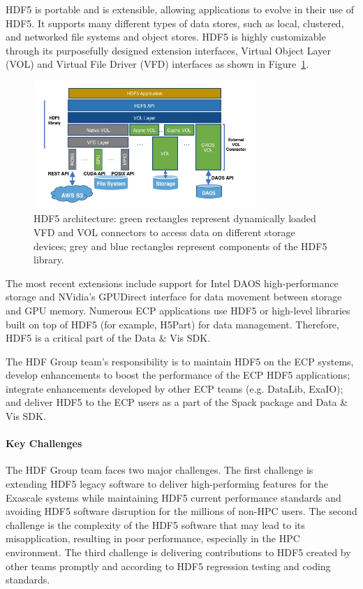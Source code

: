 HDF5 is portable and is extensible, allowing applications to evolve in their use of HDF5. It supports many different types of data stores, such as local, clustered, and networked file systems and object stores. HDF5 is highly customizable through its purposefully designed extension interfaces, Virtual Object Layer (VOL) and Virtual File Driver (VFD) interfaces as shown in Figure~\ref{fig:HDF5-Arch}.
\begin{figure}[htb]
    \centering
    \includegraphics[width=0.75\textwidth]{projects/2.3.4-DataViz/2.3.4.01-DataViz-SDK/HDF5-Arch-small.png}
    \caption{\label{fig:HDF5-Arch}
    HDF5 architecture: green rectangles represent dynamically loaded VFD and VOL connectors to access data on different storage devices; grey and blue rectangles represent components of the HDF5 library.}
\end{figure}

 The most recent extensions include support for Intel DAOS high-performance storage and NVidia’s GPUDirect interface for data movement between storage and GPU memory. 
Numerous ECP applications use HDF5 or high-level libraries built on top of HDF5 (for example, H5Part) for data management. Therefore, HDF5 is a critical part of the Data \& Vis SDK. 

The HDF Group team’s responsibility is to maintain HDF5 on the ECP systems, develop enhancements to boost the performance of the ECP HDF5 applications; integrate enhancements developed by other ECP teams (e.g. DataLib, ExaIO); and deliver HDF5  to the ECP users as a part of the Spack package and Data \& Vis SDK. 

\paragraph{Key  Challenges}
The HDF Group team faces two major challenges. The first challenge is extending HDF5 legacy software to deliver high-performing features for the Exascale systems while maintaining HDF5 current performance standards and avoiding HDF5 software disruption for the millions of non-HPC users. The second challenge is the complexity of the HDF5 software that may lead to its misapplication, resulting in poor performance, especially in the HPC environment. The third challenge is delivering contributions to HDF5 created by other teams promptly and according to HDF5 regression testing and coding standards.

